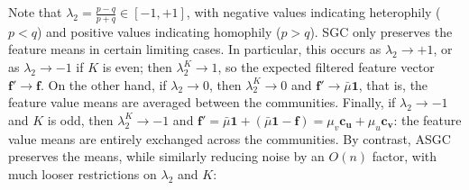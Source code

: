 \documentclass{article}
\newcommand{\tp}{{\scriptscriptstyle +}}
\newcommand{\tm}{{\scriptscriptstyle -}}
\newtheorem{theorem}{Theorem}
\newcommand{\Cam}[1]{\textcolor{blue}{Cam: #1}}
\begin{document}
Note that $\lambda_2 = \tfrac{p-q}{p+q} \in [-1,+1]$, with negative values indicating heterophily ($p < q$) and positive values indicating homophily ($p > q$). SGC only preserves the feature means in certain limiting cases. In particular, this occurs as $\lambda_2 \to +1$, or as $\lambda_2 \to -1$ if $K$ is even; then $\lambda_2^K \to 1$, so the expected filtered feature vector $\bm{f}' \to \bm{f}$. On the other hand, if $\lambda_2 \to 0$, then $\lambda_2^K \to 0$ and $\bm{f}' \to \bar{\mu}\bm{1}$, that is, the feature value means are averaged between the communities. Finally, if $\lambda_2 \to -1$ and $K$ is odd, then $\lambda_2^K \to -1$ and $\bm{f}' = \bar{\mu}\bm{1} + (\bar{\mu}\bm{1} - \bm{f})  = \mu_v \bm{c_u} + \mu_u \bm{c_v}$: the feature value means are entirely exchanged across the communities. By contrast, ASGC preserves the means, while similarly reducing noise by an $O(n)$ factor, with much looser restrictions on $\lambda_2$ and $K$:
%
\end{document}
